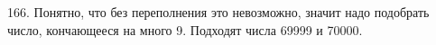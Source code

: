 166. Понятно, что без переполнения это невозможно, значит надо подобрать число, кончающееся на много 9. Подходят числа 69999 и 70000.\\
